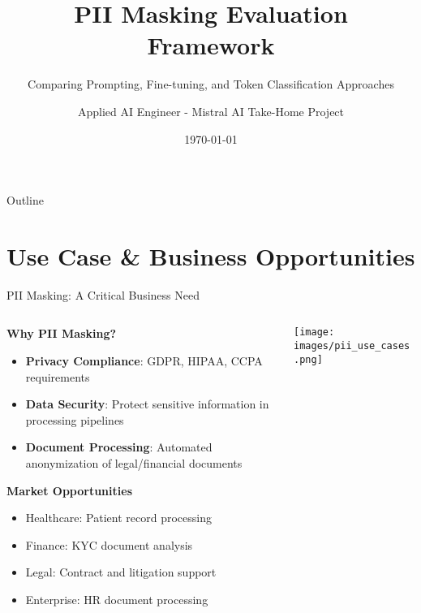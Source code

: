 \documentclass[aspectratio=169]{beamer}
\title[PII Masking with Mistral AI]{PII Masking Evaluation Framework}
\subtitle{Comparing Prompting, Fine-tuning, and Token Classification Approaches}
\author{Applied AI Engineer - Mistral AI Take-Home Project}
\date{\today}
\begin{document}
\begin{frame}
\titlepage
\end{frame}

\begin{frame}{Outline}
\tableofcontents
\end{frame}

\section{Use Case \& Business Opportunities}

\begin{frame}{PII Masking: A Critical Business Need}
\begin{columns}
\begin{column}{0.6\textwidth}
\textbf{Why PII Masking?}
\begin{itemize}
\item \textbf{Privacy Compliance}: GDPR, HIPAA, CCPA requirements
\item \textbf{Data Security}: Protect sensitive information in processing pipelines
\item \textbf{Document Processing}: Automated anonymization of legal/financial documents
\end{itemize}

\vspace{0.5cm}
\textbf{Market Opportunities}
\begin{itemize}
\item Healthcare: Patient record processing
\item Finance: KYC document analysis
\item Legal: Contract and litigation support
\item Enterprise: HR document processing
\end{itemize}
\end{column}
\begin{column}{0.4\textwidth}
\begin{center}
\texttt{[image: images/pii\_use\_cases.png]}
\end{center}
\end{column}
\end{columns}
\end{frame}
\end{document}
